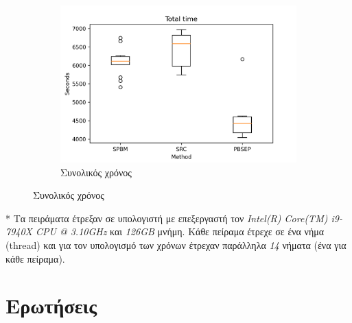 \documentclass{beamer}
\begin{document}
\begin{frame}
\begin{figure}[H]
    \begin{subfigure}[b]{0.38\linewidth}
    \includegraphics[width=\linewidth]{Total_time_plot.png}
    \caption{Συνολικός χρόνος}
    \end{subfigure}
\end{figure}

\tiny
* Τα πειράματα έτρεξαν σε υπολογιστή με επεξεργαστή τον \emph{Intel(R) Core(TM)
i9-7940X CPU @ 3.10GHz} και \emph{126GB} μνήμη. Κάθε πείραμα έτρεχε σε ένα νήμα
(thread) και για τον υπολογισμό των χρόνων έτρεχαν παράλληλα \emph{14} νήματα
(ένα για κάθε πείραμα).

\end{frame}


\section{Ερωτήσεις}
\end{document}
